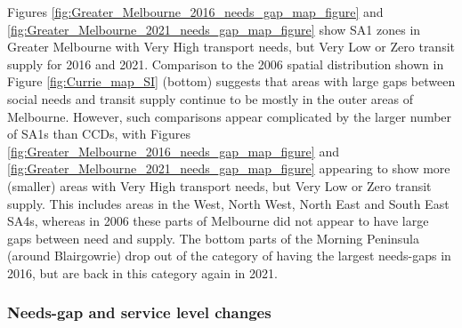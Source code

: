 \documentclass[preprint, 3p,
authoryear]{elsarticle} %
\begin{document}
Figures \ref{fig:Greater_Melbourne_2016_needs_gap_map_figure} and
\ref{fig:Greater_Melbourne_2021_needs_gap_map_figure} show SA1 zones in
Greater Melbourne with Very High transport needs, but Very Low or Zero
transit supply for 2016 and 2021. Comparison to the 2006 spatial
distribution shown in Figure \ref{fig:Currie_map_SI} (bottom) suggests
that areas with large gaps between social needs and transit supply
continue to be mostly in the outer areas of Melbourne. However, such
comparisons appear complicated by the larger number of SA1s than CCDs,
with Figures \ref{fig:Greater_Melbourne_2016_needs_gap_map_figure} and
\ref{fig:Greater_Melbourne_2021_needs_gap_map_figure} appearing to show
more (smaller) areas with Very High transport needs, but Very Low or
Zero transit supply. This includes areas in the West, North West, North
East and South East SA4s, whereas in 2006 these parts of Melbourne did
not appear to have large gaps between need and supply. The bottom parts
of the Morning Peninsula (around Blairgowrie) drop out of the category
of having the largest needs-gaps in 2016, but are back in this category
again in 2021.

\subsubsection{Needs-gap and service level
changes}\label{needs-gap-and-service-level-changes}
\end{document}
